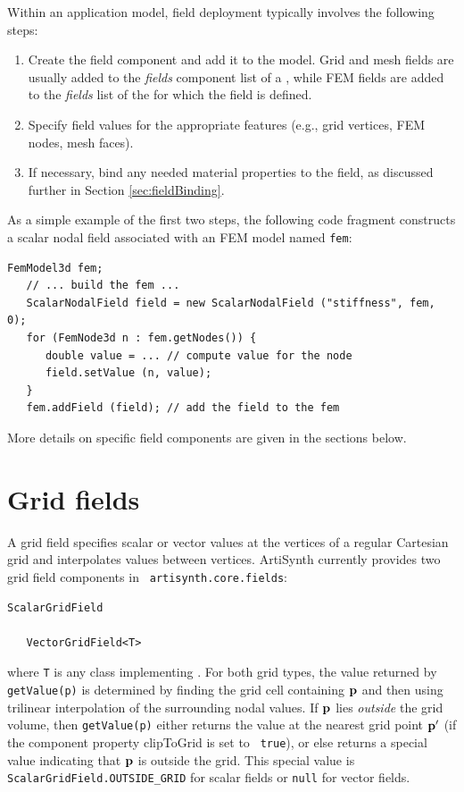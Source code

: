 Within an application model, field deployment typically involves the
following steps:

\begin{enumerate}

\item Create the field component and add it to the model. Grid and
mesh fields are usually added to the {\it fields} component list of a
, while FEM fields are
added to the {\it fields} list of the
 for which the field
is defined.

\item Specify field values for the appropriate features (e.g.,
grid vertices, FEM nodes, mesh faces).

\item If necessary, bind any needed material properties
to the field, as discussed further in Section \ref{sec:fieldBinding}.

\end{enumerate}

As a simple example of the first two steps, the following code
fragment constructs a scalar nodal field associated with an FEM model
named {\tt fem}:
%
\begin{lstlisting}[]
   FemModel3d fem; 
   // ... build the fem ...
   ScalarNodalField field = new ScalarNodalField ("stiffness", fem, 0);
   for (FemNode3d n : fem.getNodes()) {
      double value = ... // compute value for the node
      field.setValue (n, value);
   }
   fem.addField (field); // add the field to the fem
\end{lstlisting}
%

More details on specific field components are given in the sections
below.

\section{Grid fields}
\label{sec:gridFields}

A grid field specifies scalar or vector values at the vertices of a
regular Cartesian grid and interpolates values between vertices.
ArtiSynth currently provides two grid field components in {\tt
artisynth.core.fields}:
%
\begin{lstlisting}[]
   ScalarGridField

   VectorGridField<T>
\end{lstlisting}
%
where {\tt T} is any class implementing
.  For both grid types, the
value returned by {\tt getValue(p)} is determined by finding the grid
cell containing ${\bf p}$ and then using trilinear interpolation of the
surrounding nodal values. If ${\bf p}$ lies {\it outside} the grid volume,
then {\tt getValue(p)} either returns the value at the nearest grid
point ${\bf p}'$ (if the component property {\sf clipToGrid} is set to {\tt
true}), or else returns a special value indicating that ${\bf p}$ is
outside the grid. This special value is {\tt
ScalarGridField.OUTSIDE\_GRID} for scalar fields or {\tt null} for
vector fields.


